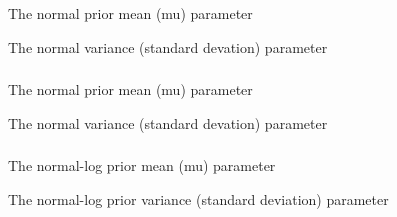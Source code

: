 \subsubsection[Normal]{}

 {The normal prior mean (mu) parameter}

 {The normal variance (standard devation) parameter}

\subsubsection[Normal By Stdev]{}

 {The normal prior mean (mu) parameter}

 {The normal variance (standard devation) parameter}

\subsubsection[Normal Log]{}

 {The normal-log prior mean (mu) parameter}

 {The normal-log prior variance (standard deviation) parameter}

\subsubsection[Uniform]{}

\subsubsection[Uniform Log]{}

